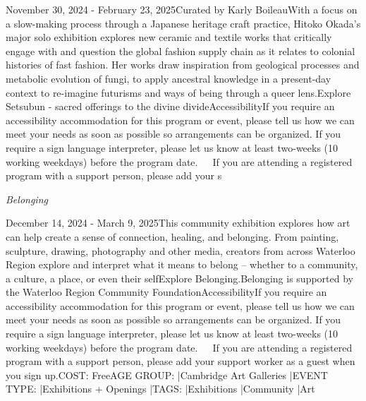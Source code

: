 \documentclass[letterpaper, 10pt]{article}
\newcommand{\subtitle}[1]{\textit{\large #1}\vspace{0.5em}}
\newcommand{\articlecontent}[1]{\small #1\vspace{1em}}
\begin{document}
\begin{multicols}{2}
{
\vspace{10px}

November 30, 2024 - February 23, 2025Curated by Karly BoileauWith a focus on a slow-making process through a Japanese heritage craft practice, Hitoko Okada’s major solo exhibition explores new ceramic and textile works that critically engage with and question the global fashion supply chain as it relates to colonial histories of fast fashion. Her works draw inspiration from geological processes and metabolic evolution of fungi, to apply ancestral knowledge in a present-day context to re-imagine futurisms and ways of being through a queer lens.Explore Setsubun - sacred offerings to the divine divideAccessibilityIf you require an accessibility accommodation for this program or event, please tell us how we can meet your needs as soon as possible so arrangements can be organized. If you require a sign language interpreter, please let us know at least two-weeks (10 working weekdays) before the program date.   If you are attending a registered program with a support person, please add your s
}
\vspace{10px}

\subtitle{Belonging}

\articlecontent{

\qrcode[height=1.5cm]{https://ideaexchange.libnet.info/event/12094580}
\vspace{10px}

December 14, 2024 - March 9, 2025This community exhibition explores how art can help create a sense of connection, healing, and belonging. From painting, sculpture, drawing, photography and other media, creators from across Waterloo Region explore and interpret what it means to belong – whether to a community, a culture, a place, or even their selfExplore Belonging.Belonging is supported by the Waterloo Region Community FoundationAccessibilityIf you require an accessibility accommodation for this program or event, please tell us how we can meet your needs as soon as possible so arrangements can be organized. If you require a sign language interpreter, please let us know at least two-weeks (10 working weekdays) before the program date.   If you are attending a registered program with a support person, please add your support worker as a guest when you sign up.COST: FreeAGE GROUP: |Cambridge Art Galleries |EVENT TYPE: |Exhibitions + Openings |TAGS: |Exhibitions |Community |Art
}
\vspace{10px}


\end{multicols}
\end{document}
